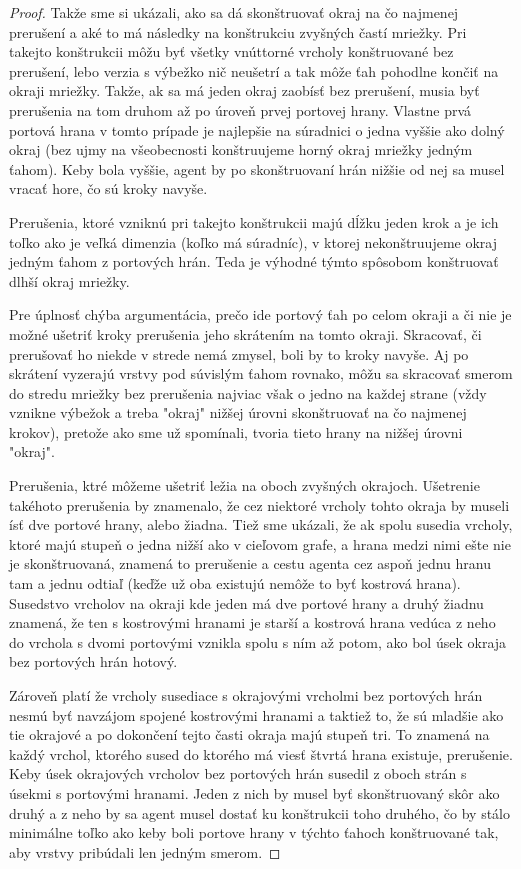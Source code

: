 \begin{proof}
Takže sme si ukázali, ako sa dá skonštruovať okraj na čo najmenej prerušení a aké
to má následky na konštrukciu zvyšných častí mriežky. Pri takejto
konštrukcii môžu byť všetky vnúttorné vrcholy konštruované bez prerušení,
lebo verzia s výbežko nič neušetrí a tak môže ťah pohodlne končiť na okraji
mriežky. Takže, ak sa má jeden okraj zaobísť bez prerušení, musia byť
prerušenia na tom druhom až po úroveň prvej portovej hrany. Vlastne prvá
portová hrana v tomto prípade je najlepšie na súradnici o jedna vyššie ako
dolný okraj (bez ujmy na všeobecnosti konštruujeme horný okraj mriežky
jedným ťahom). Keby bola vyššie, agent by po skonštruovaní hrán nižšie od
nej sa musel vracať hore, čo sú kroky navyše.

Prerušenia, ktoré vzniknú pri takejto konštrukcii majú dĺžku jeden krok a je
ich toľko ako je veľká dimenzia (koľko má súradníc), v ktorej nekonštruujeme
okraj jedným ťahom z portových hrán. Teda je výhodné týmto spôsobom
konštruovať dlhší okraj mriežky.

Pre úplnosť chýba argumentácia, prečo ide portový ťah po celom okraji a či
nie je možné ušetriť kroky prerušenia jeho skrátením na tomto okraji.
Skracovať, či prerušovať ho niekde v strede nemá zmysel, boli by to kroky
navyše. Aj po skrátení vyzerajú vrstvy pod súvislým ťahom rovnako, môžu sa
skracovať smerom do stredu mriežky bez prerušenia najviac však o jedno na
každej strane (vždy vznikne výbežok a treba "okraj" nižšej úrovni
skonštruovať na čo najmenej krokov), pretože ako sme už spomínali, tvoria
tieto hrany na nižšej úrovni "okraj".

Prerušenia, ktré môžeme ušetriť ležia na oboch zvyšných okrajoch. Ušetrenie
takéhoto prerušenia by znamenalo, že cez niektoré vrcholy tohto okraja by
museli ísť dve portové hrany, alebo žiadna. Tiež sme ukázali, že ak spolu
susedia vrcholy, ktoré majú stupeň o jedna nižší ako v cieľovom grafe,
 a hrana medzi nimi ešte nie je skonštruovaná, znamená to prerušenie a cestu
agenta cez aspoň jednu hranu tam a jednu odtiaľ (keďže už oba existujú
nemôže to byť kostrová hrana). Susedstvo vrcholov na okraji kde jeden má dve
portové hrany a druhý žiadnu znamená, že ten s kostrovými hranami je starší
a kostrová hrana vedúca z neho do vrchola s dvomi portovými vznikla spolu s
ním až potom, ako bol úsek okraja bez portových hrán hotový.

Zároveň platí že vrcholy susediace s okrajovými vrcholmi bez portových hrán
nesmú byť navzájom spojené kostrovými hranami a taktiež to, že sú mladšie
ako tie okrajové a po dokončení tejto časti okraja majú stupeň tri. To
znamená na každý vrchol, ktorého sused do ktorého má viesť štvrtá hrana
existuje, prerušenie. Keby úsek okrajových vrcholov bez portových hrán
susedil z oboch strán s úsekmi s portovými hranami. Jeden z nich by musel
byť skonštruovaný skôr ako druhý a z neho by sa agent musel dostať ku
konštrukcii toho druhého, čo by stálo minimálne toľko ako keby boli portove
hrany v týchto ťahoch konštruované tak, aby vrstvy pribúdali len jedným
smerom.


\end{proof}
